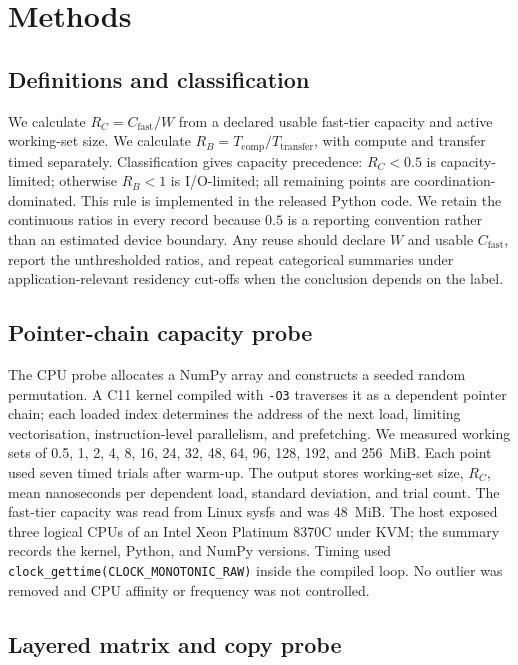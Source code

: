 \section*{Methods}
\label{sec:methods}

\subsection*{Definitions and classification}

We calculate $R_C=C_{\mathrm{fast}}/W$ from a declared usable fast-tier
capacity and active working-set size. We calculate
$R_B=T_{\mathrm{comp}}/T_{\mathrm{transfer}}$, with compute and transfer timed
separately. Classification gives capacity precedence: $R_C<0.5$ is
capacity-limited; otherwise $R_B<1$ is I/O-limited; all remaining points are
coordination-dominated. This rule is implemented in the released Python code.
We retain the continuous ratios in every record because $0.5$ is a reporting
convention rather than an estimated device boundary. Any reuse should declare
$W$ and usable $C_{\mathrm{fast}}$, report the unthresholded ratios, and repeat
categorical summaries under application-relevant residency cut-offs when the
conclusion depends on the label.

\subsection*{Pointer-chain capacity probe}

The CPU probe allocates a NumPy array and constructs a seeded random
permutation. A C11 kernel compiled with \texttt{-O3} traverses it as a dependent
pointer chain; each loaded index determines the address of the next load,
limiting vectorisation, instruction-level parallelism, and prefetching. We
measured working sets of 0.5, 1, 2, 4, 8, 16, 24, 32, 48, 64, 96, 128, 192,
and 256~MiB. Each point used seven timed trials after warm-up. The output stores
working-set size, $R_C$, mean nanoseconds per dependent load, standard
deviation, and trial count. The fast-tier capacity was read from Linux sysfs
and was 48~MiB. The host exposed three logical CPUs of an Intel Xeon Platinum
8370C under KVM; the summary records the kernel, Python, and NumPy versions.
Timing used \texttt{clock\_gettime(CLOCK\_MONOTONIC\_RAW)} inside the compiled
loop. No outlier was removed and CPU affinity or frequency was not controlled.

\subsection*{Layered matrix and copy probe}


